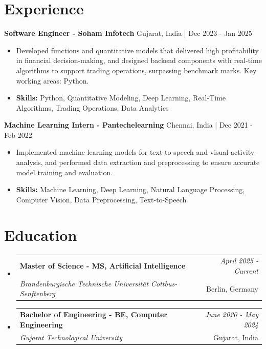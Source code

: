 \documentclass[a4paper,11pt]{article}
\makeatletter
\newcommand{\resumeSubheading}[4]{
\vspace{0.5mm}\item
    \begin{tabular*}{\linewidth}[t]{l@{\extracolsep{\fill}}r}
        \textbf{#1} & \textit{\footnotesize{#4}} \\
        \textit{\footnotesize{#3}} &  \footnotesize{#2}\\
    \end{tabular*}
    \vspace{-2.4mm}
}
\makeatother
\begin{document}
\section{\textbf{Experience}}


\vspace{1mm}
  \textbf{Software Engineer - Soham Infotech} \hfill Gujarat, India | Dec 2023 - Jan 2025
\vspace{-1.5mm} %
\begin{itemize}
  \item Developed functions and quantitative models that delivered high profitability in financial decision-making, and designed backend components with real-time algorithms to support trading operations, surpassing benchmark marks. Key working areas: Python.

\vspace{-2mm}
  \item \textbf{Skills:} Python, Quantitative Modeling, Deep Learning, Real-Time Algorithms, Trading Operations, Data Analytics
\end{itemize}

\vspace{1mm}
  \textbf{Machine Learning Intern - Pantechelearning} \hfill Chennai, India | Dec 2021 - Feb 2022
\vspace{-1.5mm} %
\begin{itemize}
  \item Implemented machine learning models for text-to-speech and visual-activity analysis, and performed data extraction and preprocessing to ensure accurate model training and evaluation.
\vspace{-2mm}
  \item \textbf{Skills:} Machine Learning, Deep Learning, Natural Language Processing, Computer Vision, Data Preprocessing, Text-to-Speech
\end{itemize}\section{\textbf{Education}}
\vspace{-0.4mm}

\begin{itemize}[leftmargin=0.15in, label={}]
\resumeSubheading
{Master of Science - MS, Artificial Intelligence }{Berlin, Germany}
{Brandenburgische Technische Universität Cottbus-Senftenberg  }{April 2025 - Current}

\vspace{1.0mm} %
\resumeSubheading
{Bachelor of Engineering - BE, Computer Engineering  }{Gujarat, India}
{Gujarat Technological University }{June 2020 - May 2024}

\end{itemize}
\end{document}
